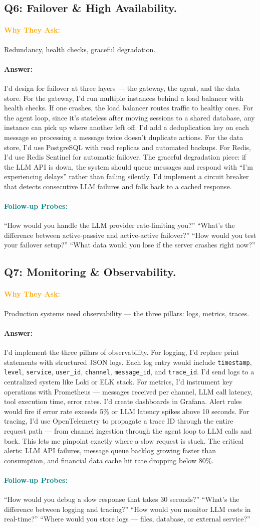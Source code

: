 \documentclass[11pt,a4paper]{article}
\newcommand{\Q}[1]{\subsection{#1}}
\newcommand{\Ans}[1]{\paragraph{\textbf{Answer:}} #1}
\newcommand{\Why}{\paragraph{\textcolor{orange}{\textbf{Why They Ask:}}}}
\newcommand{\Probe}{\paragraph{\textcolor{teal}{\textbf{Follow-up Probes:}}}}
\begin{document}
\Q{Q6: Failover \& High Availability.}
\Why Redundancy, health checks, graceful degradation.
\Ans I'd design for failover at three layers --- the gateway, the agent, and the data store. For the gateway, I'd run multiple instances behind a load balancer with health checks. If one crashes, the load balancer routes traffic to healthy ones. For the agent loop, since it's stateless after moving sessions to a shared database, any instance can pick up where another left off. I'd add a deduplication key on each message so processing a message twice doesn't duplicate actions. For the data store, I'd use PostgreSQL with read replicas and automated backups. For Redis, I'd use Redis Sentinel for automatic failover. The graceful degradation piece: if the LLM API is down, the system should queue messages and respond with ``I'm experiencing delays'' rather than failing silently. I'd implement a circuit breaker that detects consecutive LLM failures and falls back to a cached response.
\Probe ``How would you handle the LLM provider rate-limiting you?'' ``What's the difference between active-passive and active-active failover?'' ``How would you test your failover setup?'' ``What data would you lose if the server crashes right now?''

\Q{Q7: Monitoring \& Observability.}
\Why Production systems need observability --- the three pillars: logs, metrics, traces.
\Ans I'd implement the three pillars of observability. For logging, I'd replace print statements with structured JSON logs. Each log entry would include \texttt{timestamp}, \texttt{level}, \texttt{service}, \texttt{user\_id}, \texttt{channel}, \texttt{message\_id}, and \texttt{trace\_id}. I'd send logs to a centralized system like Loki or ELK stack. For metrics, I'd instrument key operations with Prometheus --- messages received per channel, LLM call latency, tool execution time, error rates. I'd create dashboards in Grafana. Alert rules would fire if error rate exceeds 5\% or LLM latency spikes above 10 seconds. For tracing, I'd use OpenTelemetry to propagate a trace ID through the entire request path --- from channel ingestion through the agent loop to LLM calls and back. This lets me pinpoint exactly where a slow request is stuck. The critical alerts: LLM API failures, message queue backlog growing faster than consumption, and financial data cache hit rate dropping below 80\%.
\Probe ``How would you debug a slow response that takes 30 seconds?'' ``What's the difference between logging and tracing?'' ``How would you monitor LLM costs in real-time?'' ``Where would you store logs --- files, database, or external service?''
\end{document}

